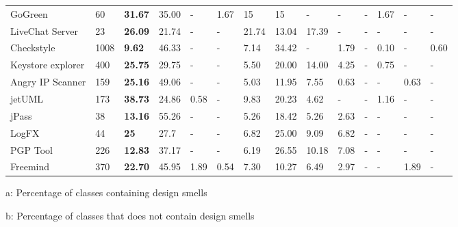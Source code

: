 \documentclass[AMA,Times1COL]{WileyNJDv5} %
\begin{document}
\begin{table}[h]
\begin{tabular*}{\textwidth}{@{\extracolsep\fill}llllllllllllll@{}}
		GoGreen & 60  & \textbf{31.67}      & 35.00     & -	 & 1.67 & 15   &  15            & -  & -       & -       & 1.67	       & -   & -   \\
		LiveChat Server & 23 &\textbf{26.09}     & 21.74     & -	 & - & 21.74  & 13.04  & 17.39	& -  & -       & -       & -	       & -      \\
		Checkstyle & 1008  & \textbf{9.62}  & 46.33   & -	 & - & 7.14  & 34.42 & -            & 1.79  & -       & 0.10       & -	       & 0.60 \\
		Keystore explorer & 400 & \textbf{25.75}  & 29.75   & -	 & - & 5.50 & 20.00 & 14.00  & 4.25  & -  & 0.75 & - & -      \\
		Angry IP Scanner & 159 &\textbf{25.16}	& 49.06  & -	 & - & 5.03  & 11.95  & 7.55      & 0.63  & -       & -       & 0.63 & -      \\ 
		jetUML & 173 & \textbf{38.73} & 24.86 & 0.58 & - & 9.83                       & 20.23 & 4.62 & -  & -       & 1.16 & -	       & -      \\
		jPass & 38  &  \textbf{13.16} & 55.26 & - & - & 5.26  & 18.42 & 5.26 & 2.63 & -       & -       & -	       & -      \\
		LogFX & 44  & \textbf{25} & 27.7 & - & - & 6.82 & 25.00 & 9.09 & 6.82 & -       & -       & -	       & -      \\
		PGP Tool & 226  & \textbf{12.83} & 37.17 & - & - & 6.19  & 26.55 & 10.18 & 7.08 & -       & -       & -	       & -      \\
		Freemind & 370  &  \textbf{22.70} & 45.95 & 1.89 & 0.54 & 7.30 & 10.27 & 6.49 & 2.97 & -       & -       & 1.89	       & -      \\
		\bottomrule
	\end{tabular*}
		\begin{tablenotes}%
			\item[a: ] Percentage of classes containing design smells
			\item[b: ] Percentage of classes that does not contain design smells
		\end{tablenotes}
\end{table}
\end{document}
